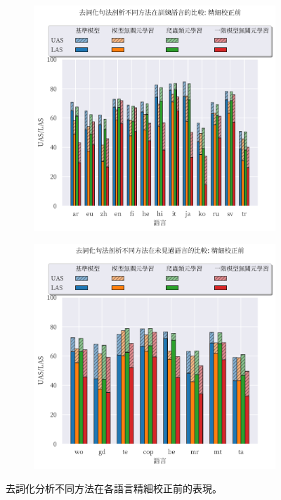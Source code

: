 \begin{figure}[!htbp]
    \centering
    \begin{subfigure}[b]{0.75\textwidth}
        \centering
        \includegraphics[width=\textwidth]{figs/chapter3/delex/bar_zs_train_langs.pdf}
    \end{subfigure}
    \vspace{-12pt}
    \begin{subfigure}[b]{0.75\textwidth}
        \centering
        \includegraphics[width=\textwidth]{figs/chapter3/delex/bar_zs_test_langs.pdf}
    \end{subfigure}
    \caption{去詞化分析不同方法在各語言精細校正前的表現。}
    \label{fig:bar_zs}
\end{figure}